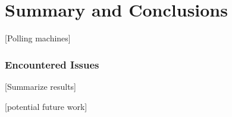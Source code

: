 \documentclass[a4paper,12pt,twoside,openright]{report}
\begin{document}

\chapter{Summary and Conclusions} 

[Polling machines]

\subsection{Encountered Issues}

[Summarize results]

[potential future work]

\appendix
\singlespacing

 
 
\end{document}
